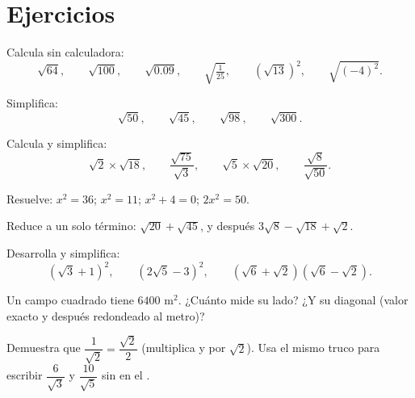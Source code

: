 \section{Ejercicios}

\begin{exercise}[$\star$]\label{exo:g9:sqrt:1}
Calcula sin calculadora:
\[
\sqrt{64}, \qquad \sqrt{100}, \qquad \sqrt{0.09}, \qquad
\sqrt{\tfrac{1}{25}}, \qquad \left(\sqrt{13}\right)^2, \qquad
\sqrt{(-4)^2} .
\]
\end{exercise}

\begin{exercise}[$\star$]\label{exo:g9:sqrt:2}
Simplifica:
\[
\sqrt{50}, \qquad \sqrt{45}, \qquad \sqrt{98}, \qquad \sqrt{300} .
\]
\end{exercise}

\begin{exercise}[$\star$]\label{exo:g9:sqrt:3}
Calcula y simplifica:
\[
\sqrt2 \times \sqrt{18}, \qquad
\frac{\sqrt{75}}{\sqrt3}, \qquad
\sqrt5 \times \sqrt{20}, \qquad
\frac{\sqrt{8}}{\sqrt{50}} .
\]
\end{exercise}

\begin{exercise}[$\star$]\label{exo:g9:sqrt:4}
Resuelve: $x^2 = 36$; \quad $x^2 = 11$; \quad $x^2 + 4 = 0$; \quad
$2x^2 = 50$.
\end{exercise}

\begin{exercise}[$\star$]\label{exo:g9:sqrt:5}
Reduce a un solo término: $\sqrt{20} + \sqrt{45}$, y después
$3\sqrt8 - \sqrt{18} + \sqrt2$.
\end{exercise}

\begin{exercise}[$\star\star$]\label{exo:g9:sqrt:6}
Desarrolla y simplifica:
\[
\left(\sqrt3 + 1\right)^2, \qquad
\left(2\sqrt5 - 3\right)^2, \qquad
\left(\sqrt6 + \sqrt2\right)\left(\sqrt6 - \sqrt2\right).
\]
\end{exercise}

\begin{exercise}[$\star\star$]\label{exo:g9:sqrt:7}
Un campo cuadrado tiene  $6400$ m$^2$. ¿Cuánto mide su lado? ¿Y
su diagonal (valor exacto y después redondeado al metro)?
\end{exercise}

\begin{exercise}[$\star\star$]\label{exo:g9:sqrt:8}
Demuestra que $\dfrac{1}{\sqrt2} = \dfrac{\sqrt2}{2}$ (multiplica  y
 por $\sqrt2$). Usa el mismo truco para escribir $\dfrac{6}{\sqrt3}$
y $\dfrac{10}{\sqrt5}$ sin  en el .
\end{exercise}

